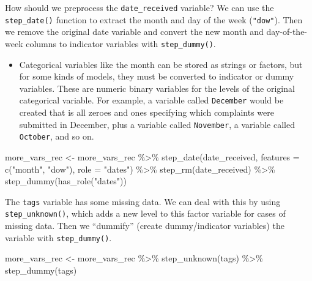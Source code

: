 \documentclass[
]{krantz}
\makeatletter
\newenvironment{Shaded}{\begin{snugshade}}{\end{snugshade}}
\newcommand{\AttributeTok}[1]{\textcolor[rgb]{0.77,0.63,0.00}{#1}}
\newcommand{\FunctionTok}[1]{\textcolor[rgb]{0.00,0.00,0.00}{#1}}
\newcommand{\NormalTok}[1]{#1}
\newcommand{\OtherTok}[1]{\textcolor[rgb]{0.56,0.35,0.01}{#1}}
\newcommand{\SpecialCharTok}[1]{\textcolor[rgb]{0.00,0.00,0.00}{#1}}
\newcommand{\StringTok}[1]{\textcolor[rgb]{0.31,0.60,0.02}{#1}}
\newenvironment{kframe}{%
\medskip{}
\setlength{\fboxsep}{.8em}
 \def\at@end@of@kframe{}%
 \ifinner\ifhmode%
  \def\at@end@of@kframe{\end{minipage}}%
  \begin{minipage}{\columnwidth}%
 \fi\fi%
 \def\FrameCommand##1{\hskip\@totalleftmargin \hskip-\fboxsep
 \colorbox{shadecolor}{##1}\hskip-\fboxsep
     \hskip-\linewidth \hskip-\@totalleftmargin \hskip\columnwidth}%
 \MakeFramed {\advance\hsize-\width
   \@totalleftmargin\z@ \linewidth\hsize
   \@setminipage}}%
 {\par\unskip\endMakeFramed%
 \at@end@of@kframe}
\renewenvironment{Shaded}{\begin{kframe}}{\end{kframe}}
\newenvironment{rmdblock}[1]
  {\begin{shaded*}
  \begin{itemize}[left = -1cm, labelsep = 1cm]
  \renewcommand{\labelitemi}{
    \raisebox{-.7\height}[0pt][0pt]{
      {\setkeys{Gin}{width=3em,keepaspectratio}\texttt{[image: images/\#1]}}
    }
  }
 
  \item
  }
  {
  \end{itemize}
  \end{shaded*}
  }
\newenvironment{rmdnote}
  {\begin{rmdblock}{note}}
  {\end{rmdblock}}
\makeatother
\begin{document}
How should we preprocess the \texttt{date\_received} variable? We can use the \texttt{step\_date()} function to extract the month and day of the week (\texttt{"dow"}). Then we remove the original date variable and convert the new month and day-of-the-week columns to indicator variables with \texttt{step\_dummy()}.

\begin{rmdnote}
Categorical variables like the month can be stored as strings or
factors, but for some kinds of models, they must be converted to
indicator or dummy variables. These are numeric binary variables for the
levels of the original categorical variable. For example, a variable
called \texttt{December} would be created that is all zeroes and ones
specifying which complaints were submitted in December, plus a variable
called \texttt{November}, a variable called \texttt{October}, and so on.
\end{rmdnote}

\begin{Shaded}
\begin{Highlighting}[]
\NormalTok{more\_vars\_rec }\OtherTok{\textless{}{-}}\NormalTok{ more\_vars\_rec }\SpecialCharTok{\%\textgreater{}\%}
  \FunctionTok{step\_date}\NormalTok{(date\_received, }\AttributeTok{features =} \FunctionTok{c}\NormalTok{(}\StringTok{"month"}\NormalTok{, }\StringTok{"dow"}\NormalTok{), }\AttributeTok{role =} \StringTok{"dates"}\NormalTok{) }\SpecialCharTok{\%\textgreater{}\%}
  \FunctionTok{step\_rm}\NormalTok{(date\_received) }\SpecialCharTok{\%\textgreater{}\%}
  \FunctionTok{step\_dummy}\NormalTok{(}\FunctionTok{has\_role}\NormalTok{(}\StringTok{"dates"}\NormalTok{))}
\end{Highlighting}
\end{Shaded}

The \texttt{tags} variable has some missing data. We can deal with this by using \texttt{step\_unknown()}, which adds a new level to this factor variable for cases of missing data. Then we ``dummify'' (create dummy/indicator variables) the variable with \texttt{step\_dummy()}.

\begin{Shaded}
\begin{Highlighting}[]
\NormalTok{more\_vars\_rec }\OtherTok{\textless{}{-}}\NormalTok{ more\_vars\_rec }\SpecialCharTok{\%\textgreater{}\%}
  \FunctionTok{step\_unknown}\NormalTok{(tags) }\SpecialCharTok{\%\textgreater{}\%}
  \FunctionTok{step\_dummy}\NormalTok{(tags)}
\end{Highlighting}
\end{Shaded}
\end{document}
